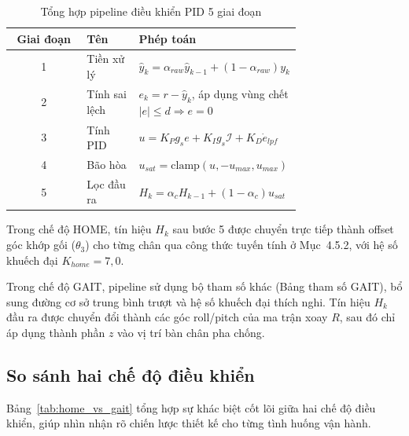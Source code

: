 \begin{table}[H]
\centering
\caption{Tổng hợp pipeline điều khiển PID 5 giai đoạn}
\label{tab:pid_pipeline}
\renewcommand{\arraystretch}{1.4}
\begin{tabular}{|c|p{0.18\linewidth}|p{0.55\linewidth}|}
\hline
\textbf{Giai đoạn} & \textbf{Tên} & \textbf{Phép toán} \\ \hline
1 & Tiền xử lý & $\hat{y}_k = \alpha_{raw} \hat{y}_{k-1} + (1-\alpha_{raw}) y_k$ \\ \hline
2 & Tính sai lệch & $e_k = r - \hat{y}_k$, áp dụng vùng chết $|e| \leq d \Rightarrow e=0$ \\ \hline
3 & Tính PID & $u = K_P g_s e + K_I g_s \mathcal{I} + K_D \dot{e}_{lpf}$ \\ \hline
4 & Bão hòa & $u_{sat} = \text{clamp}(u, -u_{max}, u_{max})$ \\ \hline
5 & Lọc đầu ra & $H_k = \alpha_c H_{k-1} + (1-\alpha_c) u_{sat}$ \\ \hline
\end{tabular}
\end{table}

Trong chế độ HOME, tín hiệu $H_k$ sau bước 5 được chuyển trực tiếp thành offset góc khớp gối ($\theta_3$) cho từng chân qua công thức tuyến tính ở Mục~4.5.2, với hệ số khuếch đại $K_{home} = 7{,}0$.

Trong chế độ GAIT, pipeline sử dụng bộ tham số khác (Bảng tham số GAIT), bổ sung đường cơ sở trung bình trượt và hệ số khuếch đại thích nghi. Tín hiệu $H_k$ đầu ra được chuyển đổi thành các góc roll/pitch của ma trận xoay $R$, sau đó chỉ áp dụng thành phần $z$ vào vị trí bàn chân pha chống.

\subsection{So sánh hai chế độ điều khiển}

Bảng~\ref{tab:home_vs_gait} tổng hợp sự khác biệt cốt lõi giữa hai chế độ điều khiển, giúp nhìn nhận rõ chiến lược thiết kế cho từng tình huống vận hành.

